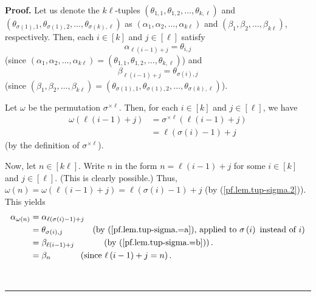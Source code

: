 \documentclass[numbers=enddot,12pt,final,onecolumn,notitlepage]{scrartcl}%
\theoremstyle{definition}
\newenvironment{proof}[1][Proof]{\noindent\textbf{#1.} }{\ \rule{0.5em}{0.5em}}
\begin{document}
\begin{proof}
Let us denote the $k\ell$-tuples $\left(  \theta_{1,1},\theta_{1,2}%
,\ldots,\theta_{k,\ell}\right)  $ and $\left(  \theta_{\sigma\left(  1\right)
,1},\theta_{\sigma\left(  1\right)  ,2},\ldots,\theta_{\sigma\left(  k\right)
,\ell}\right)  $ as $\left(  \alpha_{1},\alpha_{2},\ldots,\alpha_{k\ell
}\right)  $ and $\left(  \beta_{1},\beta_{2},\ldots,\beta_{k\ell}\right)  $,
respectively. Then, each $i\in\left[  k\right]  $ and $j\in\left[
\ell\right]  $ satisfy%
\begin{equation}
\alpha_{\ell\left(  i-1\right)  +j}=\theta_{i,j} \label{pf.lem.tup-sigma.=a}%
\end{equation}
(since $\left(  \alpha_{1},\alpha_{2},\ldots,\alpha_{k\ell}\right)  =\left(
\theta_{1,1},\theta_{1,2},\ldots,\theta_{k,\ell}\right)  $) and%
\begin{equation}
\beta_{\ell\left(  i-1\right)  +j}=\theta_{\sigma\left(  i\right)  ,j}
\label{pf.lem.tup-sigma.=b}%
\end{equation}
(since $\left(  \beta_{1},\beta_{2},\ldots,\beta_{k\ell}\right)  =\left(
\theta_{\sigma\left(  1\right)  ,1},\theta_{\sigma\left(  1\right)  ,2}%
,\ldots,\theta_{\sigma\left(  k\right)  ,\ell}\right)  $).

Let $\omega$ be the permutation $\sigma^{\times\ell}$. Then, for each
$i\in\left[  k\right]  $ and $j\in\left[  \ell\right]  $, we have%
\begin{align}
\omega\left(  \ell\left(  i-1\right)  +j\right)   &  =\sigma^{\times\ell
}\left(  \ell\left(  i-1\right)  +j\right) \nonumber\\
&  =\ell\left(  \sigma\left(  i\right)  -1\right)  +j
\label{pf.lem.tup-sigma.2}%
\end{align}
(by the definition of $\sigma^{\times\ell}$).

Now, let $n\in\left[  k\ell\right]  $. Write $n$ in the form $n=\ell\left(
i-1\right)  +j$ for some $i\in\left[  k\right]  $ and $j\in\left[
\ell\right]  $. (This is clearly possible.) Thus, $\omega\left(  n\right)
=\omega\left(  \ell\left(  i-1\right)  +j\right)  =\ell\left(  \sigma\left(
i\right)  -1\right)  +j$ (by (\ref{pf.lem.tup-sigma.2})). This yields%
\begin{align*}
\alpha_{\omega\left(  n\right)  }  &  =\alpha_{\ell\left(  \sigma\left(
i\right)  -1\right)  +j}\\
&  =\theta_{\sigma\left(  i\right)  ,j}\ \ \ \ \ \ \ \ \ \ \left(  \text{by
(\ref{pf.lem.tup-sigma.=a}), applied to }\sigma\left(  i\right)  \text{
instead of }i\right) \\
&  =\beta_{\ell\left(  i-1\right)  +j}\ \ \ \ \ \ \ \ \ \ \left(  \text{by
(\ref{pf.lem.tup-sigma.=b})}\right)  .\\
&  =\beta_{n}\ \ \ \ \ \ \ \ \ \ \left(  \text{since }\ell\left(  i-1\right)
+j=n\right)  .
\end{align*}



\end{proof}
\end{document}
